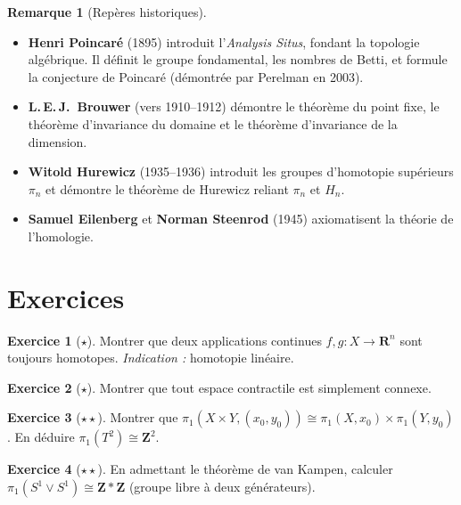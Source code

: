 \documentclass[12pt,a4paper,openany]{book}
\theoremstyle{definition}
\theoremstyle{cours}
\theoremstyle{coursnormal}
\newtheorem{remarque}[theoreme]{Remarque}
\newtheorem{exercice}{Exercice}[chapter]
\begin{document}
\begin{remarque}[Repères historiques]
\label{rem:histoire-topo-alg}
\begin{itemize}
  \item \textbf{Henri Poincaré} (1895) introduit l'\emph{Analysis Situs},
    fondant la topologie algébrique. Il définit le groupe fondamental,
    les nombres de Betti, et formule la conjecture de Poincaré
    (démontrée par Perelman en 2003).
  \item \textbf{L.\,E.\,J.\ Brouwer} (vers 1910--1912) démontre le
    théorème du point fixe, le théorème d'invariance du domaine et
    le théorème d'invariance de la dimension.
  \item \textbf{Witold Hurewicz} (1935--1936) introduit les groupes
    d'homotopie supérieurs $\pi_n$ et démontre le théorème de
    Hurewicz reliant $\pi_n$ et $H_n$.
  \item \textbf{Samuel Eilenberg} et \textbf{Norman Steenrod} (1945)
    axiomatisent la théorie de l'homologie.
\end{itemize}
\end{remarque}

\section{Exercices}
\label{sec:exo-topo-alg}

\begin{exercice}[$\star$]
\label{exo:homotopie-convexe}
Montrer que deux applications continues $f,g\colon X\to\mathbf{R}^n$
sont toujours homotopes. \textit{Indication :} homotopie linéaire.
\end{exercice}

\begin{exercice}[$\star$]
\label{exo:contractile-simplement-connexe}
Montrer que tout espace contractile est simplement connexe.
\end{exercice}

\begin{exercice}[$\star\star$]
\label{exo:pi1-produit}
Montrer que $\pi_1(X\times Y,(x_0,y_0))\cong\pi_1(X,x_0)\times
\pi_1(Y,y_0)$. En déduire $\pi_1(T^2)\cong\mathbf{Z}^2$.
\end{exercice}

\begin{exercice}[$\star\star$]
\label{exo:pi1-figure-huit}
En admettant le théorème de van Kampen, calculer
$\pi_1(S^1\vee S^1)\cong\mathbf{Z}*\mathbf{Z}$ (groupe libre à deux
générateurs).
\end{exercice}
\end{document}
